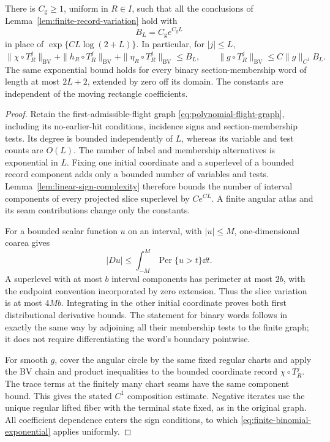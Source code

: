 \begin{theorem}
\label{thm:exponential-finite-record}
There is $C_{\mathrm g}\ge1$, uniform in $R\in I$, such that all the
conclusions of Lemma~\ref{lem:finite-record-variation} hold with
\begin{equation}\label{eq:exponential-record-budget}
 B_L=C_{\mathrm g}e^{C_{\mathrm g}L}
\end{equation}
in place of $\exp\{CL\log(2+L)\}$. In particular, for $|j|\le L$,
\[
 \|\chi\circ T_R^j\|_{\mathrm{BV}}
 +\|h_R\circ T_R^j\|_{\mathrm{BV}}
 +\|\eta_R\circ T_R^j\|_{\mathrm{BV}}\le B_L,
 \qquad
 \|g\circ T_R^j\|_{\mathrm{BV}}\le C\|g\|_{C^1}B_L.
\]
The same exponential bound holds for every binary section-membership
word of length at most $2L+2$, extended by zero off its domain.
The constants are independent of the moving rectangle coefficients.
\end{theorem}
\begin{proof}
Retain the first-admissible-flight graph
\eqref{eq:polynomial-flight-graph}, including its no-earlier-hit
conditions, incidence signs and section-membership tests. Its degree
is bounded independently of $L$, whereas its variable and test counts
are $O(L)$. The number of label and membership alternatives is
exponential in $L$. Fixing one initial coordinate and a superlevel of
a bounded record component adds only a bounded number of variables
and tests. Lemma~\ref{lem:linear-sign-complexity} therefore bounds
the number of interval components of every projected slice superlevel
by $Ce^{CL}$. A finite angular atlas and its seam contributions change
only the constants.

For a bounded scalar function $u$ on an interval, with $|u|\le M$,
one-dimensional coarea gives
\[
 |Du|\le\int_{-M}^{M}\operatorname{Per}\{u>t\}\dd t.
\]
A superlevel with at most $b$ interval components has perimeter at most
$2b$, with the endpoint convention incorporated by zero extension.
Thus the slice variation is at most $4Mb$. Integrating in the other
initial coordinate proves both first distributional derivative bounds.
The statement for binary words follows in exactly the same way by
adjoining all their membership tests to the finite graph; it does not
require differentiating the word's boundary pointwise.

For smooth $g$, cover the angular circle by the same fixed regular
charts and apply the BV chain and product inequalities to the bounded
coordinate record $\chi\circ T_R^j$. The trace terms at the finitely
many chart seams have the same component bound. This gives the stated
$C^1$ composition estimate. Negative iterates use the unique regular
lifted fiber with the terminal state fixed, as in the original graph.
All coefficient dependence enters the sign conditions, to which
\eqref{eq:finite-binomial-exponential} applies uniformly.
\end{proof}

